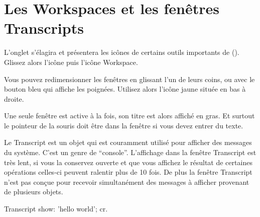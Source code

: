 \documentclass[a4paper,10pt,twoside]{book}
\begin{document}
\section{Les Workspaces et les fenêtres Transcripts}
\label{sec:transcript}


L'onglet s'élagira et présentera les icônes de certains outils importants de \sq (). Glissez alors l'icône  puis l'icône Workspace.


Vous pouvez redimensionner les fenêtres en glissant l'un de leurs coins, ou avec le bouton bleu qui affiche les poignées. Utilisez alors l'icône jaune située en bas à droite.

Une seule fenêtre est active à la fois, son titre est alors affiché en gras. Et surtout le pointeur de la souris doit être dans la fenêtre si vous devez entrer du texte.


Le Transcript est un objet qui est couramment utilisé pour afficher des messages du système.
C'est un genre de ``console''.
L'affichage dans la fenêtre Transcript est très lent, si vous la conservez ouverte et que vous affichez le résultat de certaines opérations celles-ci peuvent ralentir plus de 10 fois.
De plus la fenêtre Transcript n'est pas conçue pour recevoir simultanément des messages à afficher provenant de plusieurs objets. %




\begin{code}{}
Transcript show: 'hello world'; cr.
\end{code}

\end{document}
